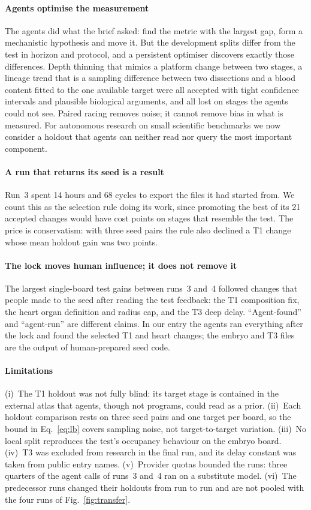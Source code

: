 \documentclass[9pt,twocolumn,a4paper]{extarticle}
\begin{document}
\paragraph{Agents optimise the measurement} The agents did what the brief asked: find the metric with the largest gap, form a mechanistic hypothesis and move it. But the development splits differ from the test in horizon and protocol, and a persistent optimiser discovers exactly those differences. Depth thinning that mimics a platform change between two stages, a lineage trend that is a sampling difference between two dissections and a blood content fitted to the one available target were all accepted with tight confidence intervals and plausible biological arguments, and all lost on stages the agents could not see. Paired racing removes noise; it cannot remove bias in what is measured. For autonomous research on small scientific benchmarks we now consider a holdout that agents can neither read nor query the most important component.

\paragraph{A run that returns its seed is a result} Run~3 spent 14 hours and 68 cycles to export the files it had started from. We count this as the selection rule doing its work, since promoting the best of its 21 accepted changes would have cost points on stages that resemble the test. The price is conservatism: with three seed pairs the rule also declined a T1 change whose mean holdout gain was two points.

\paragraph{The lock moves human influence; it does not remove it} The largest single-board test gains between runs~3 and~4 followed changes that people made to the seed after reading the test feedback: the T1 composition fix, the heart organ definition and radius cap, and the T3 deep delay. ``Agent-found'' and ``agent-run'' are different claims. In our entry the agents ran everything after the lock and found the selected T1 and heart changes; the embryo and T3 files are the output of human-prepared seed code.

\paragraph{Limitations} (i)~The T1 holdout was not fully blind: its target stage is contained in the external atlas that agents, though not programs, could read as a prior. (ii)~Each holdout comparison rests on three seed pairs and one target per board, so the bound in Eq.~\ref{eq:lb} covers sampling noise, not target-to-target variation. (iii)~No local split reproduces the test's occupancy behaviour on the embryo board. (iv)~T3 was excluded from research in the final run, and its delay constant was taken from public entry names. (v)~Provider quotas bounded the runs: three quarters of the agent calls of runs~3 and~4 ran on a substitute model. (vi)~The predecessor runs changed their holdouts from run to run and are not pooled with the four runs of Fig.~\ref{fig:transfer}.
\end{document}

